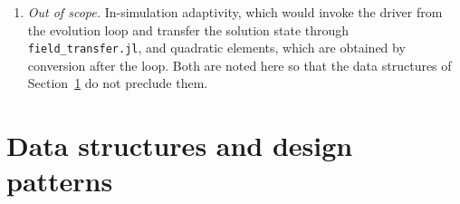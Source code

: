 \documentclass[11pt]{article}
\newcommand{\code}[1]{\texttt{#1}}
\newcommand{\omegah}{Omega\_h}
\begin{document}
\begin{enumerate}[itemsep=3pt]
  and compare the energy and scaled-Jacobian histograms of the two
  outputs; run \omegah{} on the same Exodus files where a metric is
  prescribed and compare its length and quality histograms. The first
  milestone at which this comparison is meaningful is Step 4, since
  swaps alone, alternated with the existing smoother, are expected to
  show most of the benefit.
\item \emph{Out of scope.} In-simulation adaptivity, which would invoke
  the driver from the evolution loop and transfer the solution state
  through \code{field\_transfer.jl}, and quadratic elements, which are
  obtained by conversion after the loop. Both are noted here so that the
  data structures of Section~\ref{sec:datastructures} do not preclude
  them.
\end{enumerate}

\section{Data structures and design patterns}
\label{sec:datastructures}
\end{document}

